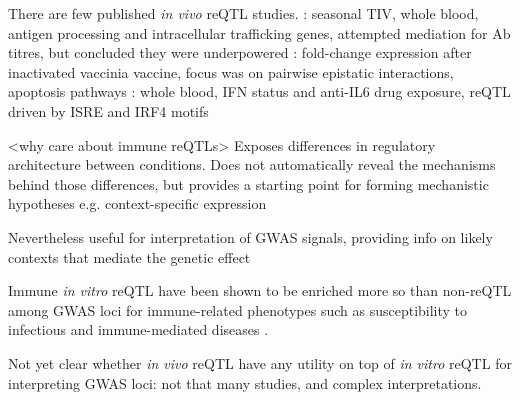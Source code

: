 \begin{outline}
    \2 There are few published \textit{in vivo} \gls{reQTL} studies.
        \3 \autocite{franco2013IntegrativeGenomicAnalysis}: seasonal \gls{TIV}, whole blood, antigen processing and intracellular trafficking genes, attempted mediation for Ab titres, but concluded they were underpowered
        \3 \autocite{lareau2016InteractionQuantitativeTrait}: fold-change expression after inactivated vaccinia vaccine, focus was on pairwise epistatic interactions, apoptosis pathways
        \3 \autocite{davenport2018DiscoveringVivoCytokineeQTL}: whole blood, IFN status and anti-IL6 drug exposure, reQTL driven by ISRE and IRF4 motifs

\1 <why care about immune reQTLs>
    \2 Exposes differences in regulatory architecture between conditions. 
    \2 Does not automatically reveal the mechanisms behind those differences, but provides a starting point for forming mechanistic hypotheses e.g. context-specific expression

    \2 Nevertheless useful for interpretation of GWAS signals, providing info on likely contexts that mediate the genetic effect

    \2 Immune \textit{in vitro} \gls{reQTL} have been shown to be enriched more so than non-\gls{reQTL} among GWAS loci for immune-related phenotypes such as
    susceptibility to infectious \autocite{barreiro2012DecipheringGeneticArchitecture,manry2017DecipheringGeneticControl}
    and immune-mediated diseases \autocite{manry2017DecipheringGeneticControl,kim-hellmuth2017GeneticRegulatoryEffects}.


    \2 Not yet clear whether \textit{in vivo} reQTL have any utility on top of \textit{in vitro} reQTL for interpreting GWAS loci: not that many studies, and complex interpretations.


\end{outline}
